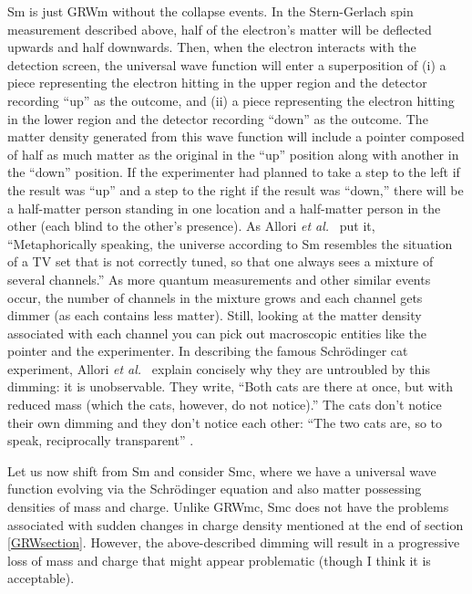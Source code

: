 \documentclass[onecolumn,secnumarabic,amsmath,amssymb,balancelastpage,nofootinbib]{article}
\begin{document}
Sm is just GRWm without the collapse events.  In the Stern-Gerlach spin measurement described above, half of the electron's matter will be deflected upwards and half downwards.  Then, when the electron interacts with the detection screen, the universal wave function will enter a superposition of (i) a piece representing the electron hitting in the upper region and the detector recording ``up'' as the outcome, and (ii) a piece representing the electron hitting in the lower region and the detector recording ``down'' as the outcome.  The matter density generated from this wave function will include a pointer composed of half as much matter as the original in the ``up'' position along with another in the ``down'' position.  If the experimenter had planned to take a step to the left if the result was ``up'' and a step to the right if the result was ``down,'' there will be a half-matter person standing in one location and a half-matter person in the other (each blind to the other's presence).  As Allori \emph{et al.}\ \cite[pg.\ 8]{allori2011} put it, ``Metaphorically speaking, the universe according to Sm resembles the situation of a TV set that is not correctly tuned, so that one always sees a mixture of several channels.''  As more quantum measurements and other similar events occur, the number of channels in the mixture grows and each channel gets dimmer (as each contains less matter).  Still, looking at the matter density associated with each channel you can pick out macroscopic entities like the pointer and the experimenter.  In describing the famous Schr\"{o}dinger cat experiment, Allori \emph{et al.}\ \cite[pg.\ 345--346]{allori2014} explain concisely why they are untroubled by this dimming: it is unobservable.  They write, ``Both cats are there at once, but with reduced mass (which the cats, however, do not notice).''  The cats don't notice their own dimming and they don't notice each other: ``The two cats are, so to speak, reciprocally transparent'' \cite[pg.\ 7]{allori2011}.

Let us now shift from Sm and consider Smc, where we have a universal wave function evolving via the Schr\"{o}dinger equation and also matter possessing densities of mass and charge.  Unlike GRWmc, Smc does not have the problems associated with sudden changes in charge density mentioned at the end of section \ref{GRWsection}.  However, the above-described dimming will result in a progressive loss of mass and charge that might appear problematic (though I think it is acceptable).
\end{document}
